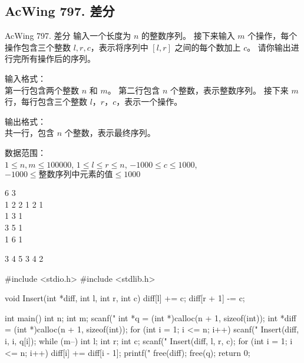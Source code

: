 \subsection{AcWing 797. 差分}
\begin{titledbox}{AcWing 797. 差分}
    输入一个长度为 $n$ 的整数序列。
    接下来输入 $m$ 个操作，每个操作包含三个整数 $l, r, c$，表示将序列中 $[l, r]$ 之间的每个数加上 $c$。
    请你输出进行完所有操作后的序列。

    输入格式：\\
    第一行包含两个整数 $n$ 和 $m$。
    第二行包含 $n$ 个整数，表示整数序列。
    接下来 $m$ 行，每行包含三个整数 $l，r，c$，表示一个操作。

    输出格式：\\
    共一行，包含 $n$ 个整数，表示最终序列。

    数据范围：\\
    $1 \le n,m \le 100000$,
    $1 \le l \le r \le n$,
    $-1000 \le c \le 1000$,
    $-1000 \le \text{整数序列中元素的值} \le 1000$

    \begin{inputblock}
        6 3 \\
        1 2 2 1 2 1 \\
        1 3 1 \\
        3 5 1 \\
        1 6 1 \\
    \end{inputblock}
    \begin{outputblock}
        3 4 5 3 4 2
    \end{outputblock}
\end{titledbox}

\begin{mycpptwocol}[差分]
    #include <stdio.h>
    #include <stdlib.h>

    void Insert(int *diff, int l, int r, int c) {
        diff[l] += c;
        diff[r + 1] -= c;
    }

    int main() {
        int n;
        int m;
        scanf("%
        int *q = (int *)calloc(n + 1, sizeof(int));
        int *diff = (int *)calloc(n + 1, sizeof(int));
        for (int i = 1; i <= n; i++) {
            scanf("%
            Insert(diff, i, i, q[i]);
        }
        while (m--) {
            int l;
            int r;
            int c;
            scanf("%
            Insert(diff, l, r, c);
        }
        for (int i = 1; i <= n; i++) {
            diff[i] += diff[i - 1];
            printf("%
        }
        free(diff);
        free(q);
        return 0;
    }
\end{mycpptwocol}

